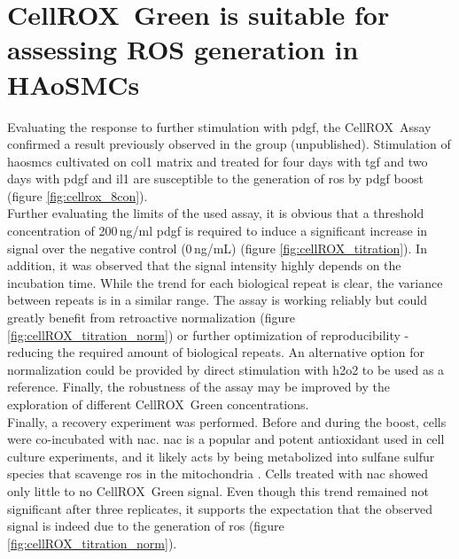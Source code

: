 \section{CellROX\texttrademark~Green is suitable for assessing ROS generation in HAoSMCs}
Evaluating the response to further stimulation with \ac{pdgf}, the CellROX\texttrademark~Assay confirmed a result previously observed in the group (unpublished). Stimulation of \acp{haosmc} cultivated on \ac{col1} matrix and treated for four days with \ac{tgf} and two days with \ac{pdgf} and \ac{il1} are susceptible to the generation of \ac{ros} by \ac{pdgf} boost (figure \ref{fig:cellrox_8con}).\\
Further evaluating the limits of the used assay, it is obvious that a threshold concentration of 200\,ng/ml \ac{pdgf} is required to induce a significant increase in signal over the negative control (0\,ng/mL) (figure \ref{fig:cellROX_titration}). In addition, it was observed that the signal intensity highly depends on the incubation time. While the trend for each biological repeat is clear, the variance between repeats is in a similar range. The assay is working reliably but could greatly benefit from retroactive normalization (figure \ref{fig:cellROX_titration_norm}) or further optimization of reproducibility - reducing the required amount of biological repeats. An alternative option for normalization could be provided by direct stimulation with \ac{h2o2} to be used as a reference. Finally, the robustness of the assay may be improved by the exploration of different CellROX\texttrademark~Green concentrations.\\
Finally, a recovery experiment was performed. Before and during the boost, cells were co-incubated with \ac{nac}. \ac{nac} is a popular and potent antioxidant used in cell culture experiments, and it likely acts by being metabolized into sulfane sulfur species that scavenge \ac{ros} in the mitochondria \cite{ezerinaNAcetylCysteineFunctions2018}. Cells treated with \ac{nac} showed only little to no CellROX\texttrademark~Green signal. Even though this trend remained not significant after three replicates, it supports the expectation that the observed signal is indeed due to the generation of \ac{ros} (figure \ref{fig:cellROX_titration_norm}).\\
